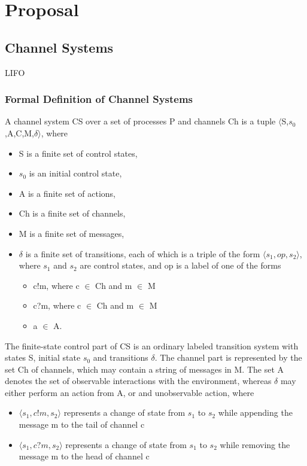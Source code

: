 \newpage
\section{Proposal}

\subsection{Channel Systems}
LIFO

\subsubsection{Formal Definition of Channel Systems}
\label{CS}
A channel system CS over a set of processes P and channels Ch is a tuple $\langle$S,$s_0$,A,C,M,$\delta$$\rangle$, where
\begin{itemize}
\item[]
S is a finite set of control states,
\item[]
$s_0$ is an initial control state,
\item[]
A is a finite set of actions,
\item[]
Ch is a finite set of channels,
\item[]
M is a finite set of messages,
\item[]
$\delta$ is a finite set of transitions, each of which is a triple of the form $\langle s_1,op,s_2\rangle$, where $s_1$ and $s_2$ are control states, and op is a label of one of the forms

\begin{itemize}
\item
c!m, where c $\in$ Ch and m $\in$ M
\item
c?m, where c $\in$ Ch and m $\in$ M
\item
a $\in$ A.
\end{itemize}
\end{itemize}

The finite-state control part of CS is an ordinary labeled transition system with states S, initial state $s_0$ and transitions $\delta$. The channel part is represented by the set Ch of channels, which may contain a string of messages in M. The set A denotes the set of observable interactions with the environment, whereas $\delta$ may either perform an action from A, or and unobservable action, where

\begin{itemize}
\item[]
$\langle s_1, c!m, s_2\rangle$ represents a change of state from $s_1$ to $s_2$ while appending the message m to the tail of channel c
\item[]
$\langle s_1, c?m, s_2\rangle$ represents a change of state from $s_1$ to $s_2$ while removing the message m to the head of channel c
\end{itemize}

